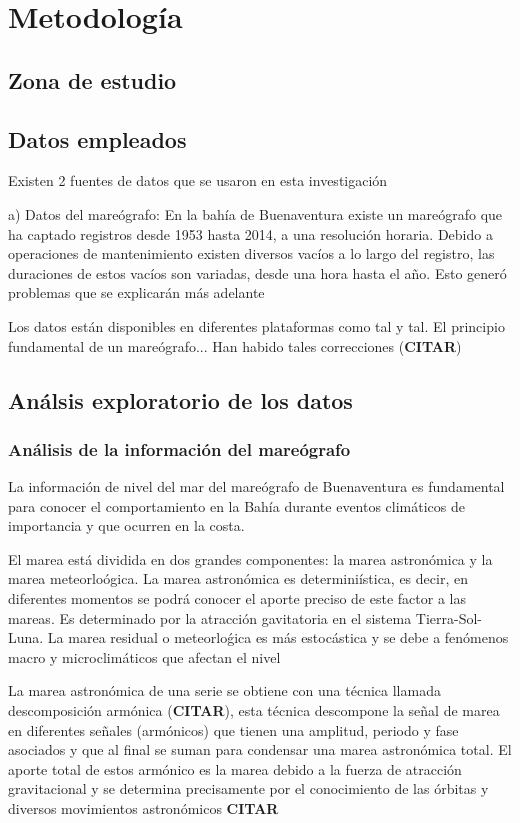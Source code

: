 \chapter{Metodología}

\section{Zona de estudio}

\section{Datos empleados}
 Existen 2 fuentes de datos que se usaron en esta investigación

a) Datos del mareógrafo: En la bahía de Buenaventura existe un mareógrafo que ha captado registros desde 1953 hasta 2014, a una resolución horaria. Debido a operaciones de mantenimiento existen diversos vacíos a lo largo del registro, las duraciones de estos vacíos son variadas, desde una hora hasta el año. Esto generó problemas que se explicarán más adelante

Los datos están disponibles en diferentes plataformas como tal y tal. El principio fundamental de un mareógrafo... Han habido tales correcciones (\textbf{CITAR})

\section{Análsis exploratorio de los datos}

\subsection{Análisis de la información del mareógrafo}

La información de nivel del mar del mareógrafo de Buenaventura es fundamental para conocer el comportamiento en la Bahía durante eventos climáticos de importancia y que ocurren en la costa.

El marea está dividida en dos grandes componentes: la marea astronómica y la marea meteorloógica. La marea astronómica es determiniística, es decir, en diferentes momentos se podrá conocer el aporte preciso de este factor a las mareas. Es determinado por la atracción gavitatoria en el sistema Tierra-Sol-Luna. La marea residual o meteorloǵica es más estocástica y se debe a fenómenos macro y microclimáticos que afectan el nivel

La marea astronómica de una serie se obtiene con una técnica llamada descomposición armónica (\textbf{CITAR}), esta técnica descompone la señal de marea en diferentes señales (armónicos) que tienen una amplitud, periodo y fase asociados y que al final se suman para condensar una marea astronómica total. El aporte total de estos armónico es la marea debido a la fuerza de atracción gravitacional y se determina precisamente por el conocimiento de las órbitas y diversos movimientos astronómicos \textbf{CITAR}

